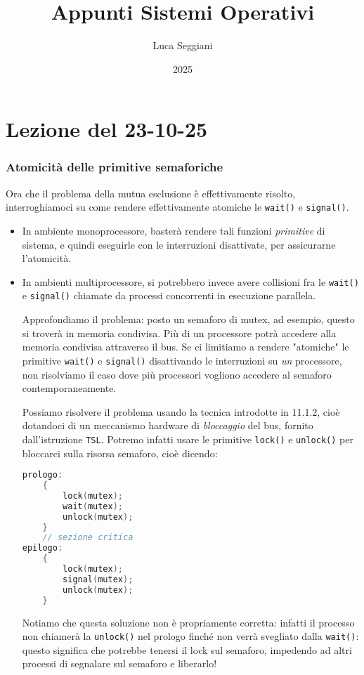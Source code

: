 \documentclass[a4paper,11pt]{article}
\title{Appunti Sistemi Operativi}
\author{Luca Seggiani}
\date{2025}
\begin{document}
\section{Lezione del 23-10-25}

\thispagestyle{empty}
\pagestyle{fancy}

\subsubsection{Atomicità delle primitive semaforiche}
Ora che il problema della mutua esclusione è effettivamente risolto, interroghiamoci su come rendere effettivamente atomiche le \lstinline|wait()| e \lstinline|signal()|. 

\begin{itemize}
	\item 
In ambiente monoprocessore, basterà rendere tali funzioni \textit{primitive} di sistema, e quindi eseguirle con le interruzioni disattivate, per assicurarne l'atomicità.
	\item
In ambienti multiprocessore, si potrebbero invece avere collisioni fra le \lstinline|wait()| e \lstinline|signal()| chiamate da processi concorrenti in esecuzione parallela.

Approfondiamo il problema: posto un semaforo di mutex, ad esempio, questo si troverà in memoria condivisa.
Più di un processore potrà accedere alla memoria condivisa attraverso il bus.
Se ci limitiamo a rendere "atomiche" le primitive \lstinline|wait()| e \lstinline|signal()| disattivando le interruzioni su \textit{un} processore, non risolviamo il caso dove più processori vogliono accedere al semaforo contemporaneamente. 

Possiamo risolvere il problema usando la tecnica introdotte in 11.1.2, cioè dotandoci di un meccanismo hardware di \textit{bloccaggio} del bus, fornito dall'istruzione \lstinline|TSL|.
Potremo infatti usare le primitive \lstinline|lock()| e \lstinline|unlock()| per bloccarci sulla risorsa semaforo, cioè dicendo: 
\begin{lstlisting}[language=C++, style=codestyle]	
prologo:
	{
		lock(mutex);
		wait(mutex);
		unlock(mutex);
	}
	// sezione critica
epilogo: 
	{
		lock(mutex);
		signal(mutex);
		unlock(mutex);
	}
\end{lstlisting}

Notiamo che questa soluzione non è propriamente corretta: infatti il processo non chiamerà la \lstinline|unlock()| nel prologo finché non verrà svegliato dalla \lstinline|wait()|: questo significa che potrebbe tenersi il lock sul semaforo, impedendo ad altri processi di segnalare sul semaforo e liberarlo! 


\end{itemize}
\end{document}
